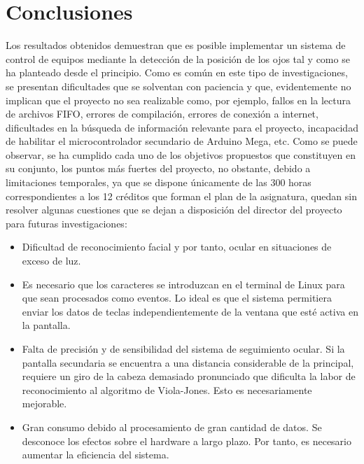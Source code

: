
\chapter{Conclusiones} \label{cap5}

Los resultados obtenidos demuestran que es posible implementar un sistema de control de equipos mediante la detección de la posición de los ojos tal y como se ha planteado desde el principio. Como es común en este tipo de investigaciones, se presentan dificultades que se solventan con paciencia y que, evidentemente no implican que el proyecto no sea realizable como, por ejemplo, fallos en la lectura de archivos FIFO, errores de compilación, errores de conexión a internet, dificultades en la búsqueda de información relevante para el proyecto, incapacidad de habilitar el microcontrolador secundario de Arduino Mega, etc. Como se puede observar, se ha cumplido cada uno de los objetivos propuestos que constituyen en su conjunto, los puntos más fuertes del proyecto, no obstante, debido a limitaciones temporales, ya que se dispone únicamente de las 300 horas correspondientes a los 12 créditos que forman el plan de la asignatura, quedan sin resolver algunas cuestiones que se dejan a disposición del director del proyecto para futuras investigaciones:

\begin{itemize}
    \item  Dificultad de reconocimiento facial y por tanto, ocular en situaciones de exceso de luz.
    \item Es necesario que los caracteres se introduzcan en el terminal de Linux para que sean procesados como eventos. Lo ideal es que el sistema permitiera enviar los datos de teclas independientemente de la ventana que esté activa en la pantalla.
    \item Falta de precisión y de sensibilidad del sistema de seguimiento ocular. Si la pantalla secundaria se encuentra a una distancia considerable de la principal, requiere un giro de la cabeza demasiado pronunciado que dificulta la labor de reconocimiento al algoritmo de Viola-Jones. Esto es necesariamente mejorable.
    \item Gran consumo debido al procesamiento de gran cantidad de datos. Se desconoce los efectos sobre el hardware a largo plazo. Por tanto, es necesario aumentar la eficiencia del sistema.
\end{itemize}
















\newpage

